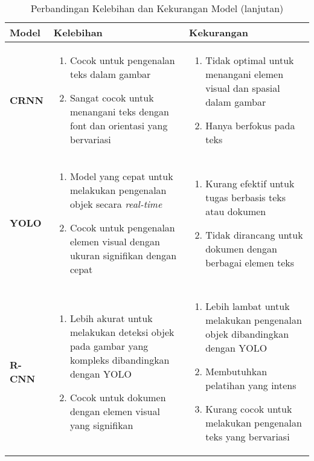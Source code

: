 \begin{table}[h!]
\ContinuedFloat %
\caption{Perbandingan Kelebihan dan Kekurangan Model (lanjutan)}
\begin{tabularx}{\linewidth}{|p{1.75cm}|X|X|}
\hline
\textbf{Model} & \textbf{Kelebihan} & \textbf{Kekurangan} \\
\hline

\textbf{CRNN} &
\begin{enumerate}
    \item Cocok untuk pengenalan teks dalam gambar
    \item Sangat cocok untuk menangani teks dengan font dan orientasi yang bervariasi
\end{enumerate}
&
\begin{enumerate}
    \item Tidak optimal untuk menangani elemen visual dan spasial dalam gambar
    \item Hanya berfokus pada teks
\end{enumerate}
\\ \hline

\textbf{YOLO} &
\begin{enumerate}
    \item Model yang cepat untuk melakukan pengenalan objek secara \textit{real-time}
    \item Cocok untuk pengenalan elemen visual dengan ukuran signifikan dengan cepat
\end{enumerate}
&
\begin{enumerate}
    \item Kurang efektif untuk tugas berbasis teks atau dokumen
    \item Tidak dirancang untuk dokumen dengan berbagai elemen teks
\end{enumerate}
\\ \hline

\textbf{R-CNN} &
\begin{enumerate}
    \item Lebih akurat untuk melakukan deteksi objek pada gambar yang kompleks dibandingkan dengan \newline YOLO
    \item Cocok untuk dokumen dengan elemen visual yang signifikan
\end{enumerate}
&
\begin{enumerate}
    \item Lebih lambat untuk melakukan pengenalan objek dibandingkan dengan \newline YOLO
    \item Membutuhkan pelatihan yang intens
    \item Kurang cocok untuk melakukan pengenalan teks yang bervariasi
\end{enumerate}
\\ \hline
\end{tabularx}
\end{table}

